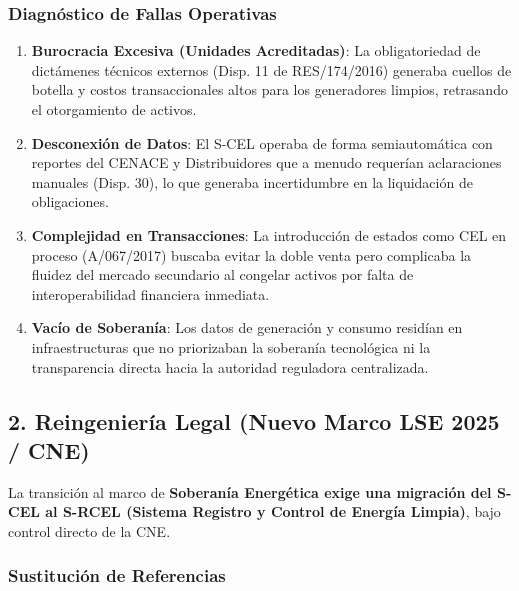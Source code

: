 \documentclass{cel}
\begin{document}
\subsubsection{Diagnóstico de Fallas Operativas}
\nopagebreak

\begin{enumerate}
\item \textbf{Burocracia Excesiva (Unidades Acreditadas)}: La obligatoriedad de dictámenes técnicos externos (Disp. 11 de RES/174/2016) generaba cuellos de botella y costos transaccionales altos para los generadores limpios, retrasando el otorgamiento de activos.
\item \textbf{Desconexión de Datos}: El S-CEL operaba de forma semiautomática con reportes del CENACE y Distribuidores que a menudo requerían aclaraciones manuales (Disp. 30), lo que generaba incertidumbre en la liquidación de obligaciones.
\item \textbf{Complejidad en Transacciones}: La introducción de estados como \textquotedbl{}CEL en proceso\textquotedbl{} (A/067/2017) buscaba evitar la doble venta pero complicaba la fluidez del mercado secundario al congelar activos por falta de interoperabilidad financiera inmediata.
\item \textbf{Vacío de Soberanía}: Los datos de generación y consumo residían en infraestructuras que no priorizaban la soberanía tecnológica ni la transparencia directa hacia la autoridad reguladora centralizada.


\end{enumerate}
\subsection{2. Reingeniería Legal (Nuevo Marco LSE 2025 / CNE)}
\nopagebreak

La transición al marco de \textbf{Soberanía Energética \textbf{ exige una migración del S-CEL al }S-RCEL (Sistema Registro y Control de Energía Limpia)}, bajo control directo de la CNE.


\vspace{0.4cm}
\subsubsection{Sustitución de Referencias}
\nopagebreak
\end{document}
